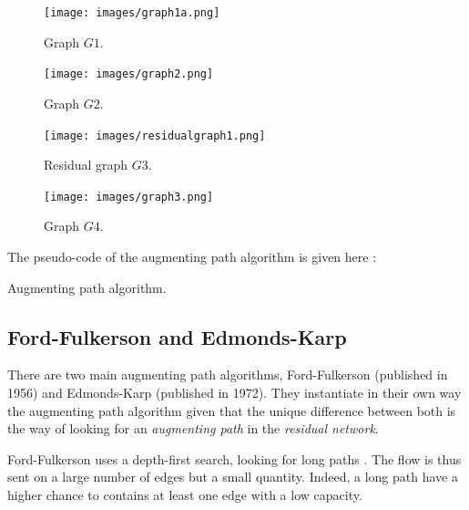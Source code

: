 \begin{figure}[h]
   \begin{minipage}[b]{0.40\linewidth}
      \centering \texttt{[image: images/graph1a.png]}
      \caption{Graph $G1$.}
   \end{minipage}\hfill
   \begin{minipage}[b]{0.48\linewidth}   
      \centering \texttt{[image: images/graph2.png]}
      \caption{Graph $G2$.}
   \end{minipage}\hfill
   \begin{minipage}[b]{0.48\linewidth}   
      \centering \texttt{[image: images/residualgraph1.png]}
      \caption{Residual graph $G3$.}
   \end{minipage}\hfill
   \begin{minipage}[b]{0.48\linewidth}  
      \centering \texttt{[image: images/graph3.png]}
      \caption{Graph $G4$.}
   \end{minipage}
\end{figure}


The pseudo-code of the augmenting path algorithm is given here :

\begin{algorithm}[h]

 \caption{Augmenting path algorithm.}
\end{algorithm}

\newpage
\subsection{Ford-Fulkerson and Edmonds-Karp}
There are two main augmenting path algorithms, Ford-Fulkerson (published in 1956) and Edmonds-Karp (published in 1972). They instantiate in their own way the augmenting path algorithm given that the unique difference between both is the way of looking for an \textit{augmenting path} in the \textit{residual network}. \newline

Ford-Fulkerson uses a depth-first search, looking for long paths \cite{lectu5}. The flow is thus sent on a large number of edges but a small quantity. Indeed, a long path have a higher chance to contains at least one edge with a low capacity. \newline

